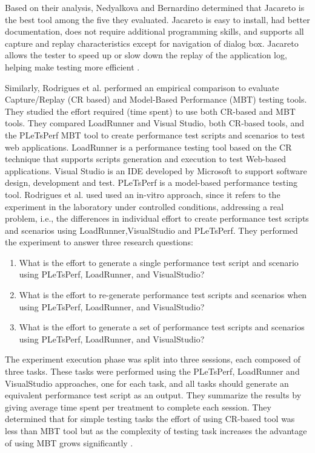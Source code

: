 \documentclass[12pt,journal]{IEEEtran}
\begin{document}
Based on their analysis, Nedyalkova and Bernardino determined that Jacareto is the best tool among the five they evaluated. Jacareto is easy to install, had better documentation, does not require additional programming skills, and supports all capture and replay characteristics except for navigation of dialog box. Jacareto allows the tester to speed up or slow down the replay of the application log, helping make testing more efficient .
\par
Similarly, Rodrigues et al. \cite{Rodrigues:2014:ECR:2652524.2652587} performed an empirical comparison to evaluate Capture/Replay (CR based) and Model-Based Performance (MBT) testing tools. They studied the effort required (time spent) to use both CR-based and MBT tools. They compared LoadRunner and Visual Studio, both CR-based tools, and the PLeTsPerf MBT tool to create performance test scripts and scenarios to test web applications. LoadRunner is a performance testing tool based on the CR technique that supports scripts generation and execution to test Web-based applications. Visual Studio is an IDE developed by Microsoft to support software design, development and test. PLeTsPerf is a model-based performance testing tool. Rodrigues et al. used used an in-vitro approach, since it refers to the experiment in the laboratory under controlled conditions, addressing a real problem, i.e., the differences in individual effort to create performance test scripts and scenarios using LoadRunner,VisualStudio and PLeTsPerf. They performed the experiment to answer three research questions:
\begin{enumerate}
\item What is the effort to generate a single performance test script and scenario using PLeTsPerf, LoadRunner, and VisualStudio?
\item What is the effort to re-generate performance test scripts and scenarios when using PLeTsPerf, LoadRunner, and VisualStudio?
\item What is the effort to generate a set of performance test scripts and scenarios using PLeTsPerf, LoadRunner, and VisualStudio?
\end{enumerate}
The experiment execution phase was split into three sessions, each composed of three tasks. These tasks were performed using the PLeTsPerf, LoadRunner  and VisualStudio approaches, one for each task, and all tasks should generate an equivalent performance test script as an output. They summarize the results by giving average time spent per treatment to complete each session. They determined that for simple testing tasks the effort of using CR-based tool was less than MBT tool but as the complexity of testing task increases the advantage of using MBT grows significantly .
\end{document}
